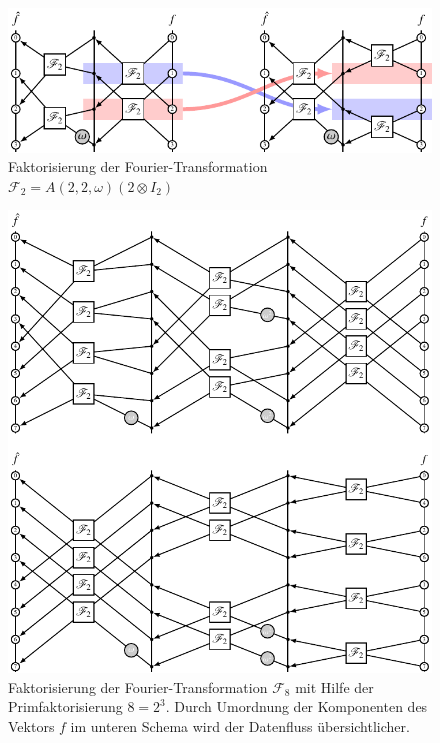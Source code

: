 \begin{figure}
\centering
\includegraphics{chapters/060-diskret/images/f4.pdf}
\caption{Faktorisierung der Fourier-Transformation $\mathscr{F}_2
= A(2,2,\omega) (\mathscr{2}\otimes I_2)$
\label{buch:diskret:schnell:fig:f4}}
\end{figure}%
\begin{figure}
\centering
\includegraphics{chapters/060-diskret/images/f8.pdf}
\caption{Faktorisierung der Fourier-Transformation $\mathscr{F}_8$
mit Hilfe der Primfaktorisierung $8=2^3$.
Durch Umordnung der Komponenten des Vektors $f$ im unteren Schema
wird der Datenfluss übersichtlicher.
\label{buch:diskret:schnell:fig:f8}}
\end{figure}%
